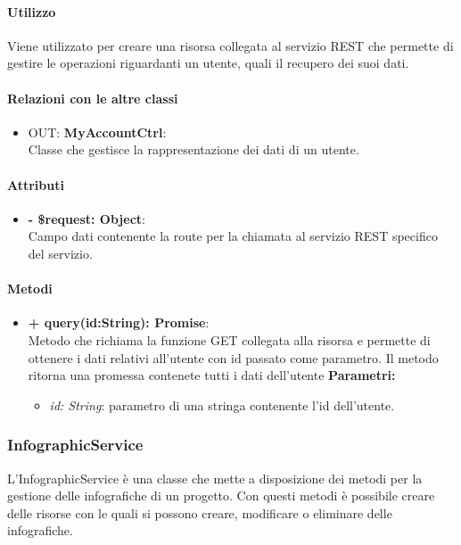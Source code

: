 		\paragraph{Utilizzo}
		Viene utilizzato per creare una risorsa collegata al servizio REST che permette di gestire le operazioni riguardanti un utente, quali il recupero dei suoi dati.
		
		\paragraph{Relazioni con le altre classi}
		\begin{itemize}
			\item OUT: \textbf{MyAccountCtrl}:\\
			Classe che gestisce la rappresentazione dei dati di un utente.
		\end{itemize}
		
		\paragraph{Attributi}
		\begin{itemize}
			\item \textbf{- \$request: Object}:\\
			Campo dati contenente la route per la chiamata al servizio REST specifico del servizio.
		\end{itemize}	
		
		\paragraph{Metodi}
		\begin{itemize}
			\item \textbf{+ query(id:String): Promise}:\\
			Metodo che richiama la funzione GET collegata alla risorsa e permette di ottenere i dati relativi all'utente con id passato come parametro. Il metodo ritorna una promessa contenete tutti i dati dell'utente
			\textbf{Parametri:}\\
			\begin{itemize}
				\item \textit{id: String}: parametro di una stringa contenente l'id dell'utente.
			\end{itemize}
		\end{itemize}


\subsubsection{InfographicService}
L'InfographicService è una classe che mette a disposizione dei metodi per la gestione delle infografiche di un progetto. Con questi metodi è possibile creare delle risorse con le quali si possono creare, modificare o eliminare delle infografiche.


